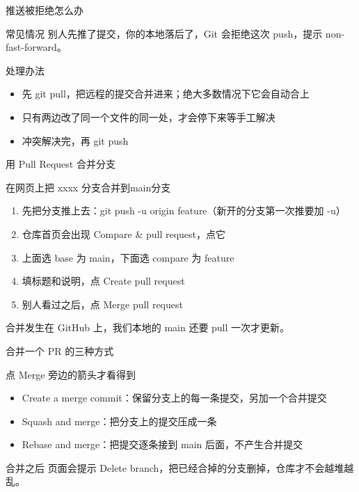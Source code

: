 \documentclass[aspectratio=169]{beamer}
\begin{document}
\begin{frame}{推送被拒绝怎么办}
	\begin{block}{常见情况}
		\hspace*{2em}别人先推了提交，你的本地落后了，Git 会拒绝这次 push，提示 non-fast-forward。
	\end{block}
\begin{block}{处理办法}
	\begin{itemize}
		\item 先 git pull，把远程的提交合并进来；绝大多数情况下它会自动合上
		\item 只有两边改了同一个文件的同一处，才会停下来等手工解决
		\item 冲突解决完，再 git push
	\end{itemize}
\end{block}
\end{frame}

\begin{frame}{用 Pull Request 合并分支}
	\begin{block}{在网页上把 xxxx 分支合并到main分支 }
		\begin{enumerate}
			\item 先把分支推上去：git push -u origin feature（新开的分支第一次推要加 -u）
			\item 仓库首页会出现 Compare \& pull request，点它
			\item 上面选 base 为 main，下面选 compare 为 feature
			\item 填标题和说明，点 Create pull request
			\item 别人看过之后，点 Merge pull request
		\end{enumerate}
	\end{block}
	\begin{center}
		\alert{合并发生在 GitHub 上，我们本地的 main 还要 pull 一次才更新。}
	\end{center}
\end{frame}

\begin{frame}{合并一个 PR 的三种方式}
	\begin{block}{点 Merge 旁边的箭头才看得到}
		\begin{itemize}
			\item Create a merge commit：保留分支上的每一条提交，另加一个合并提交
			\item Squash and merge：把分支上的提交压成一条
			\item Rebase and merge：把提交逐条接到 main 后面，不产生合并提交
		\end{itemize}
	\end{block}
	\begin{block}{合并之后}
		\hspace*{2em}页面会提示 Delete branch，把已经合掉的分支删掉，仓库才不会越堆越乱。
	\end{block}
\end{frame}
\end{document}
